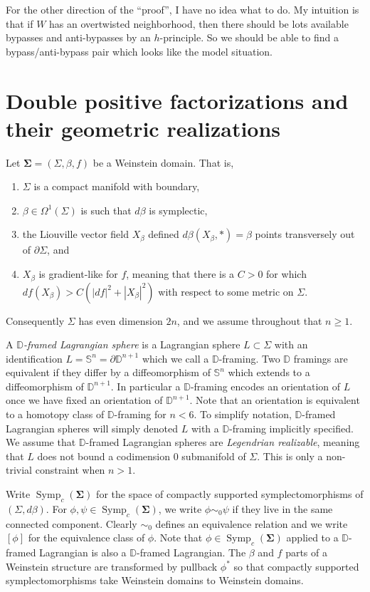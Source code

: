 \documentclass[11pt]{amsart}
\DeclareMathOperator{\Symp}{Symp}
\newcommand{\thicc}[1]{\pmb{#1}}
\newcommand{\disk}{\mathbb{D}}
\newcommand{\be}{\begin{enumerate}}
\newcommand{\ee}{\end{enumerate}}
\newcommand{\sphere}{\mathbb{S}}
\begin{document}
For the other direction of the ``proof'', I have no idea what to do. My intuition is that if $W$ has an overtwisted neighborhood, then there should be lots available bypasses and anti-bypasses by an $h$-principle. So we should be able to find a bypass/anti-bypass pair which looks like the model situation.

\section{Double positive factorizations and their geometric realizations}

Let $\thicc{\Sigma} = (\Sigma, \beta, f)$ be a Weinstein domain. That is,
\be
\item $\Sigma$ is a compact manifold with boundary,
\item $\beta \in \Omega^{1}(\Sigma)$ is such that $d\beta$ is symplectic,
\item the Liouville vector field $X_{\beta}$ defined $d\beta(X_{\beta}, \ast) = \beta$ points transversely out of $\partial \Sigma$, and
\item $X_{\beta}$ is gradient-like for $f$, meaning that there is a $C > 0$ for which $df(X_{\beta}) > C(|df|^{2} + |X_{\beta}|^{2})$ with respect to some metric on $\Sigma$.
\ee
Consequently $\Sigma$ has even dimension $2n$, and we assume throughout that $n \geq 1$.

A \emph{$\disk$-framed Lagrangian sphere} is a Lagrangian sphere $L \subset \Sigma$ with an identification $L = \sphere^{n} = \partial \disk^{n+1}$ which we call a $\disk$-framing. Two $\disk$ framings are equivalent if they differ by a diffeomorphism of $\sphere^{n}$ which extends to a diffeomorphism of $\disk^{n+1}$. In particular a $\disk$-framing encodes an orientation of $L$ once we have fixed an orientation of $\disk^{n+1}$. Note that an orientation is equivalent to a homotopy class of $\disk$-framing for $n < 6$. To simplify notation, $\disk$-framed Lagrangian spheres will simply denoted $L$ with a $\disk$-framing implicitly specified. We assume that $\disk$-framed Lagrangian spheres are \emph{Legendrian realizable}, meaning that $L$ does not bound a codimension $0$ submanifold of $\Sigma$. This is only a non-trivial constraint when $n > 1$.

Write $\Symp_{c}(\thicc{\Sigma})$ for the space of compactly supported symplectomorphisms of $(\Sigma, d\beta)$. For $\phi, \psi \in \Symp_{c}(\thicc{\Sigma})$, we write $\phi \sim_{0} \psi$ if they live in the same connected component. Clearly $\sim_{0}$ defines an equivalence relation and we write $[\phi]$ for the equivalence class of $\phi$. Note that $\phi \in \Symp_{c}(\thicc{\Sigma})$ applied to a $\disk$-framed Lagrangian is also a $\disk$-framed Lagrangian. The $\beta$ and $f$ parts of a Weinstein structure are transformed by pullback $\phi^{\ast}$ so that compactly supported symplectomorphisms take Weinstein domains to Weinstein domains.
\end{document}

